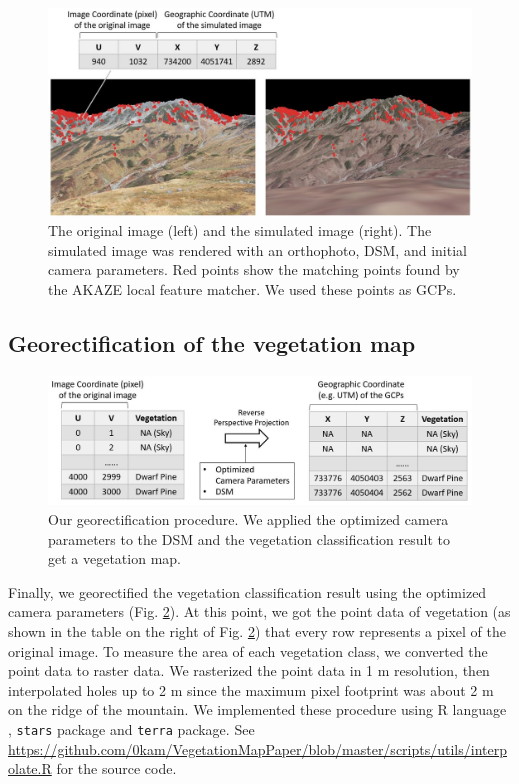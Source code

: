 \documentclass{article}
\begin{document}
\begin{figure}
\includegraphics[width=1\linewidth]{paper_files/figures/Slide4} \caption{The original image (left) and the simulated image (right). The simulated image was rendered with an orthophoto, DSM, and initial camera parameters. Red points show the matching points found by the AKAZE local feature matcher. We used these points as GCPs.}\label{fig:matched}
\end{figure}

\hypertarget{georectification-of-the-vegetation-map}{%
\subsection{Georectification of the vegetation map}\label{georectification-of-the-vegetation-map}}



\begin{figure}
\includegraphics[width=1\linewidth]{paper_files/figures/Slide6} \caption{Our georectification procedure. We applied the optimized camera parameters to the DSM and the vegetation classification result to get a vegetation map.}\label{fig:georec}
\end{figure}

Finally, we georectified the vegetation classification result using the optimized camera parameters (Fig. \ref{fig:georec}). At this point, we got the point data of vegetation (as shown in the table on the right of Fig. \ref{fig:georec}) that every row represents a pixel of the original image. To measure the area of each vegetation class, we converted the point data to raster data. We rasterized the point data in 1 m resolution, then interpolated holes up to 2 m since the maximum pixel footprint was about 2 m on the ridge of the mountain. We implemented these procedure using R language \cite{RCore}, \texttt{stars} package \cite{Rstars} and \texttt{terra} \cite{Rterra} package. See \url{https://github.com/0kam/VegetationMapPaper/blob/master/scripts/utils/interpolate.R} for the source code.
\end{document}
